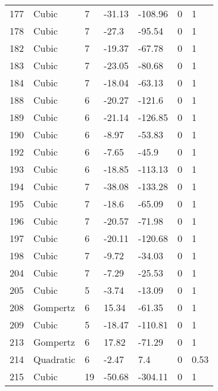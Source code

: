 \documentclass[11pt]{article}
\begin{document}
\begin{center}
\begin{longtable}{lllllll}
        177 & Cubic     & 7               & -31.13  & -108.96 & 0       & 1    \\
        178 & Cubic     & 7               & -27.3   & -95.54  & 0       & 1    \\
        182 & Cubic     & 7               & -19.37  & -67.78  & 0       & 1    \\
        183 & Cubic     & 7               & -23.05  & -80.68  & 0       & 1    \\
        184 & Cubic     & 7               & -18.04  & -63.13  & 0       & 1    \\
        188 & Cubic     & 6               & -20.27  & -121.6  & 0       & 1    \\
        189 & Cubic     & 6               & -21.14  & -126.85 & 0       & 1    \\
        190 & Cubic     & 6               & -8.97   & -53.83  & 0       & 1    \\
        192 & Cubic     & 6               & -7.65   & -45.9   & 0       & 1    \\
        193 & Cubic     & 6               & -18.85  & -113.13 & 0       & 1    \\
        194 & Cubic     & 7               & -38.08  & -133.28 & 0       & 1    \\
        195 & Cubic     & 7               & -18.6   & -65.09  & 0       & 1    \\
        196 & Cubic     & 7               & -20.57  & -71.98  & 0       & 1    \\
        197 & Cubic     & 6               & -20.11  & -120.68 & 0       & 1    \\
        198 & Cubic     & 7               & -9.72   & -34.03  & 0       & 1    \\
        204 & Cubic     & 7               & -7.29   & -25.53  & 0       & 1    \\
        205 & Cubic     & 5               & -3.74   & -13.09  & 0       & 1    \\
        208 & Gompertz  & 6               & 15.34   & -61.35  & 0       & 1    \\
        209 & Cubic     & 5               & -18.47  & -110.81 & 0       & 1    \\
        213 & Gompertz  & 6               & 17.82   & -71.29  & 0       & 1    \\
        214 & Quadratic & 6               & -2.47   & 7.4     & 0       & 0.53 \\
        215 & Cubic     & 19              & -50.68  & -304.11 & 0       & 1    \\

\end{longtable}
\end{center}
\end{document}
